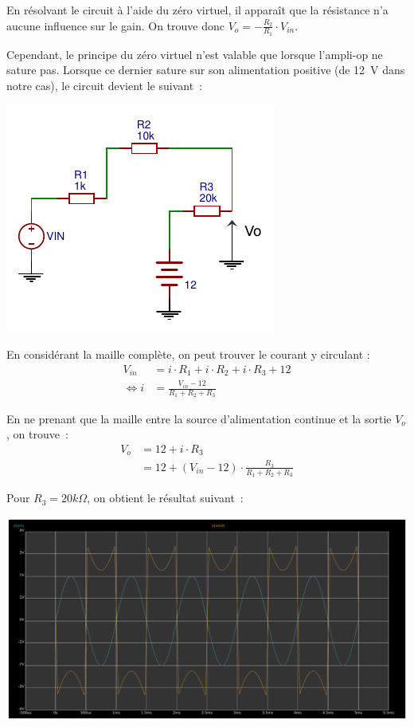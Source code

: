 \documentclass{../../template/tp}
\begin{document}
{
    En résolvant le circuit à l'aide du zéro virtuel, il apparaît que la résistance n'a aucune influence sur le gain.
    On trouve donc $V_{o} = - \frac{R_2}{R_1} \cdot V_{in}$.

    Cependant, le principe du zéro virtuel n'est valable que lorsque l'ampli-op ne sature pas.
    Lorsque ce dernier sature sur son alimentation positive (de 12~V dans notre cas), le circuit devient le suivant~:
    \begin{center}
        \includegraphics[scale=1.4]{inverseur-charge-saturation.pdf}
    \end{center}

    En considérant la maille complète, on peut trouver le courant y circulant :
    \begin{align*}
    V_{in} & = i \cdot R_1 + i \cdot R_2 + i \cdot R_3 + 12\\
    \Leftrightarrow i & = \frac{V_{in} - 12}{R_1 + R_2 + R_ 3}
    \end{align*}

    En ne prenant que la maille entre la source d'alimentation continue et la sortie $V_o$, on trouve~:
    \begin{align*}
    V_o & = 12 + i \cdot R_3 \\
    & = 12 + (V_{in} - 12) \cdot \frac{R_3}{R_1 + R_2 + R_ 3}
    \end{align*}

    Pour $R_3 = 20 k\Omega$, on obtient le résultat suivant~:

    \begin{center}
        \includegraphics[width=\textwidth]{inverseur-charge-saturation-waveform.pdf}
    \end{center}
}
\end{document}
